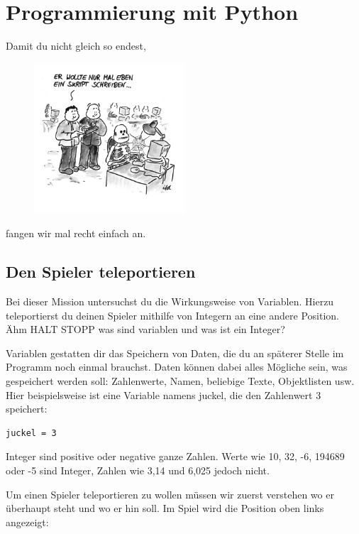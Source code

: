 \section{Programmierung mit Python}

Damit du nicht gleich so endest,
\begin{figure}[H]
\includegraphics[width=0.5\textwidth]{Bilder/mal_eben_ein_skript_schreiben.jpg} %
\end{figure}
fangen wir mal recht einfach an.

\subsection{Den Spieler teleportieren}

Bei  dieser  Mission  untersuchst  du  die  Wirkungsweise  von  Variablen. 
Hierzu  teleportierst  du  deinen  Spieler  mithilfe  von  Integern  an  eine 
andere Position.
Ähm HALT STOPP was sind variablen und was ist ein Integer? 

Variablen gestatten dir das Speichern von Daten, die du an späterer Stelle im Programm  noch  einmal  brauchst. Daten können  dabei  alles  Mögliche  sein, was   gespeichert   werden   soll:   Zahlenwerte,   Namen,   beliebige  Texte, Objektlisten usw. Hier beispielsweise ist eine Variable namens juckel, die den Zahlenwert 3 speichert: 

\lstset{language=Python}
\lstset{frame=lines}
\lstset{basicstyle=\footnotesize}
\begin{lstlisting}
juckel = 3
\end{lstlisting}

Integer sind positive oder negative ganze Zahlen. Werte wie 10, 32, -6, 194689 oder -5 sind Integer, Zahlen wie 3,14 und 6,025 jedoch nicht.

Um einen Spieler teleportieren zu wollen müssen wir zuerst verstehen wo er überhaupt steht und wo er hin soll. Im Spiel wird die Position oben links angezeigt:

